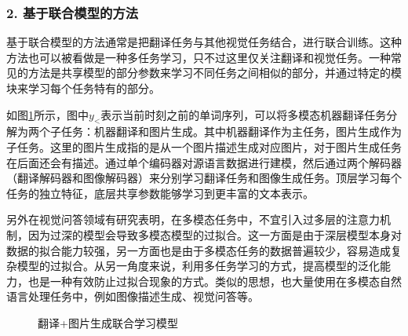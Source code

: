 
\subsubsection{2. 基于联合模型的方法}

\parinterval 基于联合模型的方法通常是把翻译任务与其他视觉任务结合，进行联合训练。这种方法也可以被看做是一种多任务学习，只不过这里仅关注翻译和视觉任务。一种常见的方法是共享模型的部分参数来学习不同任务之间相似的部分，并通过特定的模块来学习每个任务特有的部分。

\parinterval 如图\ref{fig:17-14}所示，图中$y_{<}$表示当前时刻之前的单词序列，可以将多模态机器翻译任务分解为两个子任务：机器翻译和图片生成。其中机器翻译作为主任务，图片生成作为子任务。这里的图片生成指的是从一个图片描述生成对应图片，对于图片生成任务在后面还会有描述。通过单个编码器对源语言数据进行建模，然后通过两个解码器（翻译解码器和图像解码器）来分别学习翻译任务和图像生成任务。顶层学习每个任务的独立特征，底层共享参数能够学习到更丰富的文本表示。

\parinterval 另外在视觉问答领域有研究表明，在多模态任务中，不宜引入过多层的注意力机制，因为过深的模型会导致多模态模型的过拟合。这一方面是由于深层模型本身对数据的拟合能力较强，另一方面也是由于多模态任务的数据普遍较少，容易造成复杂模型的过拟合。从另一角度来说，利用多任务学习的方式，提高模型的泛化能力，也是一种有效防止过拟合现象的方式。类似的思想，也大量使用在多模态自然语言处理任务中，例如图像描述生成、视觉问答等。

\begin{figure}[htp]
\centering

\caption{翻译+图片生成联合学习模型}
\label{fig:17-14}
\end{figure}


